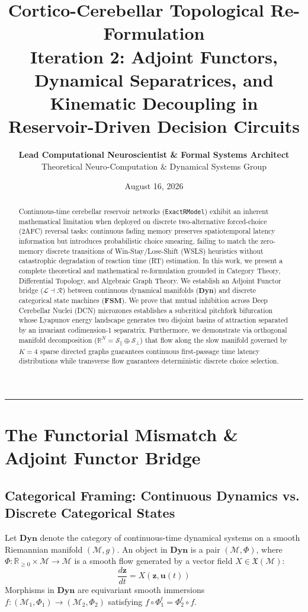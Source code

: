 \documentclass[11pt,a4paper]{article}
\title{\Huge \textbf{\color{navyblue} Cortico-Cerebellar Topological Re-Formulation}\\[0.4em]
\Large \textbf{Iteration 2: Adjoint Functors, Dynamical Separatrices, and Kinematic Decoupling in Reservoir-Driven Decision Circuits}}
\author{\textbf{Lead Computational Neuroscientist \& Formal Systems Architect}\\[0.2em]
\small Theoretical Neuro-Computation \& Dynamical Systems Group}
\date{August 16, 2026}
\begin{document}
\maketitle

\begin{abstract}
Continuous-time cerebellar reservoir networks (\texttt{ExactRModel}) exhibit an inherent mathematical limitation when deployed on discrete two-alternative forced-choice (2AFC) reversal tasks: continuous fading memory preserves spatiotemporal latency information but introduces probabilistic choice smearing, failing to match the zero-memory discrete transitions of Win-Stay/Lose-Shift (WSLS) heuristics without catastrophic degradation of reaction time (RT) estimation. In this work, we present a complete theoretical and mathematical re-formulation grounded in Category Theory, Differential Topology, and Algebraic Graph Theory. We establish an Adjoint Functor bridge ($\mathcal{L} \dashv \mathcal{R}$) between continuous dynamical manifolds ($\mathbf{Dyn}$) and discrete categorical state machines ($\mathbf{FSM}$). We prove that mutual inhibition across Deep Cerebellar Nuclei (DCN) microzones establishes a subcritical pitchfork bifurcation whose Lyapunov energy landscape generates two disjoint basins of attraction separated by an invariant codimension-1 separatrix. Furthermore, we demonstrate via orthogonal manifold decomposition ($\mathbb{R}^N = \mathcal{S}_\parallel \oplus \mathcal{S}_\perp$) that flow along the slow manifold governed by $K=4$ sparse directed graphs guarantees continuous first-passage time latency distributions while transverse flow guarantees deterministic discrete choice selection.
\end{abstract}

\vspace{0.8em}
\hrule
\vspace{0.8em}

\section{The Functorial Mismatch \& Adjoint Functor Bridge}

\subsection{Categorical Framing: Continuous Dynamics vs. Discrete Categorical States}
Let $\mathbf{Dyn}$ denote the category of continuous-time dynamical systems on a smooth Riemannian manifold $(\mathcal{M}, g)$. An object in $\mathbf{Dyn}$ is a pair $(\mathcal{M}, \Phi)$, where $\Phi: \mathbb{R}_{\ge 0} \times \mathcal{M} \to \mathcal{M}$ is a smooth flow generated by a vector field $X \in \mathfrak{X}(\mathcal{M})$:
\begin{equation}
\frac{d\mathbf{z}}{dt} = X(\mathbf{z}, \mathbf{u}(t))
\end{equation}
Morphisms in $\mathbf{Dyn}$ are equivariant smooth immersions $f: (\mathcal{M}_1, \Phi_1) \to (\mathcal{M}_2, \Phi_2)$ satisfying $f \circ \Phi_1^t = \Phi_2^t \circ f$.
\end{document}
